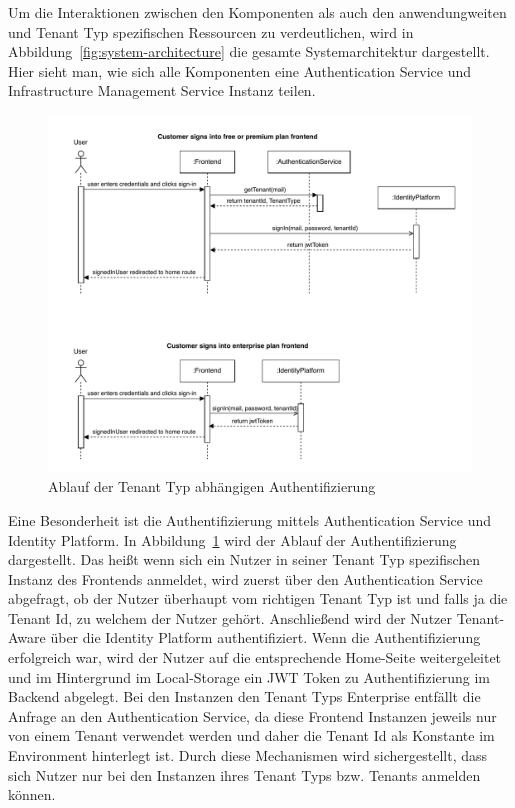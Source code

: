 Um die Interaktionen zwischen den Komponenten als auch den anwendungweiten und Tenant Typ spezifischen Ressourcen zu verdeutlichen, wird in Abbildung~\ref{fig:system-architecture} die gesamte Systemarchitektur dargestellt.
Hier sieht man, wie sich alle Komponenten eine Authentication Service und Infrastructure Management Service Instanz teilen.

\begin{figure}[ht]
	\centering
	\includegraphics[width=\textwidth]{resources/03-runtime-view/pdf/authentication-sequence.pdf}
	\caption{Ablauf der Tenant Typ abhängigen Authentifizierung}
	\label{fig:authentication-sequence}
\end{figure}

Eine Besonderheit ist die Authentifizierung mittels Authentication Service und Identity Platform. In Abbildung~\ref{fig:authentication-sequence} wird der Ablauf der Authentifizierung dargestellt. Das heißt wenn sich ein Nutzer in seiner Tenant Typ spezifischen Instanz des Frontends anmeldet, wird zuerst über den Authentication Service abgefragt, ob der Nutzer überhaupt vom richtigen Tenant Typ ist und falls ja die Tenant Id, zu welchem der Nutzer gehört. Anschließend wird der Nutzer Tenant-Aware über die Identity Platform authentifiziert. Wenn die Authentifizierung erfolgreich war, wird der Nutzer auf die entsprechende Home-Seite weitergeleitet und im Hintergrund im Local-Storage ein JWT Token zu Authentifizierung im Backend abgelegt.
Bei den Instanzen den Tenant Typs Enterprise entfällt die Anfrage an den Authentication Service, da diese Frontend Instanzen jeweils nur von einem Tenant verwendet werden und daher die Tenant Id als Konstante im Environment hinterlegt ist.
 Durch diese Mechanismen wird sichergestellt, dass sich Nutzer nur bei den Instanzen ihres Tenant Typs bzw. Tenants anmelden können.


